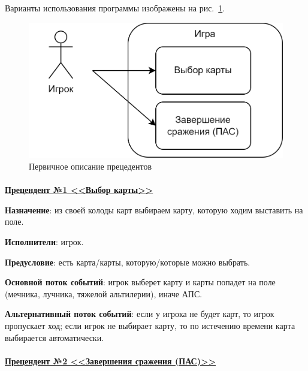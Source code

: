 \documentclass[12pt, a4paper, simple]{eskdtext}
\begin{document}
    Варианты использования программы изображены на рис.~\ref{fig:game__use_case_diagram}.

    \begin{figure}[!h]
        \centering
        \includegraphics[]
            {../sources/game_architecture/build/game__use_case_diagram.png}
        \caption{Первичное описание прецедентов}
        \label{fig:game__use_case_diagram}
    \end{figure}

    \paragraph{}\hspace{0pt}

    \textbf{\underline{Прецендент №1 <<Выбор карты>>}}

    \textbf{Назначение}: из своей колоды карт выбираем карту, которую ходим выставить на поле.

    \textbf{Исполнители}: игрок.

    \textbf{Предусловие}: есть карта/карты, которую/которые можно выбрать.

    \textbf{Основной поток событий}: игрок выберет карту и карты попадет на поле (мечника, лучника, тяжелой альтилерии),
    иначе АПС.

    \textbf{Альтернативный поток событий}: если у игрока не будет карт, то игрок пропускает ход;
    если игрок не выбирает карту, то по истечению времени карта выбирается автоматически.

    \paragraph{}\hspace{0pt}

    \textbf{\underline{Прецендент №2 <<Завершения сражения (ПАС)>>}}
\end{document}
